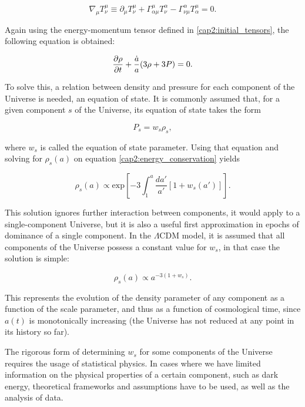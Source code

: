 \documentclass[openany,a4paper,12pt,oneside]{book}
\begin{document}
\begin{spacing}{1.5}
\begin{equation}\label{energy_momentum_conservation}
    \nabla_\mu T^\mu_\nu\equiv \partial_\mu T^\mu_\nu+\Gamma^\mu_{\alpha\mu}T^\alpha_\nu-\Gamma^\alpha_{\nu\mu}T^\mu_\alpha=0.
\end{equation}

Again using the energy-momentum tensor defined in \eqref{cap2:initial_tensors}, the following equation is obtained:

\begin{equation}\label{cap2:energy_conservation}
    \pdv{\rho}{t}+\frac{\dot{a}}{a}(3\rho+3P)=0.
\end{equation}

To solve this, a relation between density and pressure for each component of the Universe is needed, an equation of state. It is commonly assumed that, for a given component $s$ of the Universe, its equation of state takes the form

\begin{equation}\label{ch2:eq_state}
    P_s=w_s\rho_s,
\end{equation}

\noindent where $w_s$ is called the equation of state parameter. Using that equation and solving for $\rho_s(a)$ on equation \eqref{cap2:energy_conservation} yields

\begin{equation}\label{ch2:rho_s(a)_general}
    \rho_s(a)\propto \text{exp}\left[-3\int_1^a \frac{da'}{a'}[1+w_s(a')]\right].
\end{equation}

This solution ignores further interaction between components, it would apply to a single-component Universe, but it is also a useful first approximation in epochs of dominance of a single component. In the $\Lambda$CDM model, it is assumed that all components of the Universe possess a constant value for $w_s$, in that case the solution is simple:

\begin{equation}\label{ch2:rho_s_ws_const}
    \rho_s(a)\propto a^{-3(1+w_s)}.
\end{equation}

\noindent This represents the evolution of the density parameter of any component as a function of the scale parameter, and thus as a function of cosmological time, since $a(t)$ is monotonically increasing (the Universe has not reduced at any point in its history so far).

The rigorous form of determining $w_s$ for some components of the Universe requires the usage of statistical physics. In cases where we have limited information on the physical properties of a certain component, such as dark energy, theoretical frameworks and assumptions have to be used, as well as the analysis of data.


\end{spacing}
\end{document}
